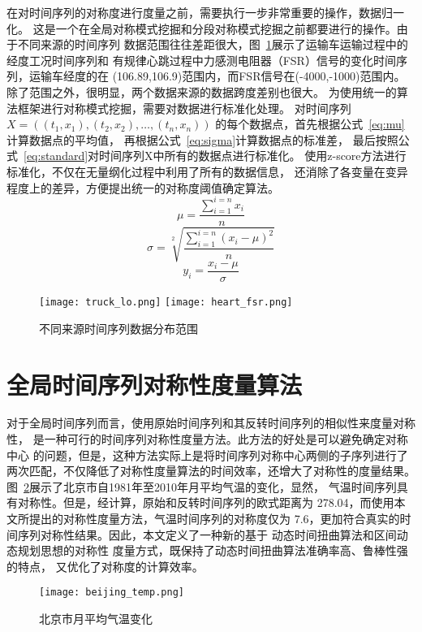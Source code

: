 在对时间序列的对称度进行度量之前，需要执行一步非常重要的操作，数据归一化。
这是一个在全局对称模式挖掘和分段对称模式挖掘之前都要进行的操作。由于不同来源的时间序列
数据范围往往差距很大，图~\ref{fig:data_range}展示了运输车运输过程中的经度工况时间序列和
有规律心跳过程中力感测电阻器（FSR）信号的变化时间序列，运输车经度的在
(106.89,106.9)范围内，而FSR信号在(-4000,-1000)范围内。
除了范围之外，很明显，两个数据来源的数据跨度差别也很大。
为使用统一的算法框架进行对称模式挖掘，需要对数据进行标准化处理。
对时间序列$X=\left(\left(t_{1}, x_{1}\right),\left(t_{2}, x_{2}\right), \ldots,\left(t_{n}, x_{n}\right)\right)$
的每个数据点，首先根据公式~\ref{eq:mu}计算数据点的平均值，
再根据公式~\ref{eq:sigma}计算数据点的标准差，
最后按照公式~\ref{eq:standard}对时间序列X中所有的数据点进行标准化。
使用z-score方法进行标准化，不仅在无量纲化过程中利用了所有的数据信息，
还消除了各变量在变异程度上的差异，方便提出统一的对称度阈值确定算法。
\begin{equation}
  \mu=\frac{\sum_{i=1}^{i=n} x_{i}}{n}
  \label{eq:mu}
\end{equation}
\begin{equation}
  \sigma=\sqrt[2]{\frac{\sum_{i=1}^{i=n}\left(x_{i}-\mu\right)^{2}}{n}}
  \label{eq:sigma}
\end{equation}
\begin{equation}
  y_{i}=\frac{x_{i}-\mu}{\sigma}
  \label{eq:standard}
\end{equation}
\begin{figure}
  \centering
  {\texttt{[image: truck\_lo.png]}}
  {\texttt{[image: heart\_fsr.png]}}
  \caption{不同来源时间序列数据分布范围}
  \label{fig:data_range}
\end{figure}

\section{全局时间序列对称性度量算法}

对于全局时间序列而言，使用原始时间序列和其反转时间序列的相似性来度量对称性，
是一种可行的时间序列对称性度量方法。此方法的好处是可以避免确定对称中心
的问题，但是，这种方法实际上是将时间序列对称中心两侧的子序列进行了
两次匹配，不仅降低了对称性度量算法的时间效率，还增大了对称性的度量结果。
图~\ref{fig:beijing_temp}展示了北京市自1981年至2010年月平均气温的变化，显然，
气温时间序列具有对称性。但是，经计算，原始和反转时间序列的欧式距离为
278.04，而使用本文所提出的对称性度量方法，气温时间序列的对称度仅为
7.6，更加符合真实的时间序列对称性结果。因此，本文定义了一种新的基于
动态时间扭曲算法和区间动态规划思想的对称性
度量方式，既保持了动态时间扭曲算法准确率高、鲁棒性强的特点，
又优化了对称度的计算效率。
\begin{figure}
  \centering
  \texttt{[image: beijing\_temp.png]}
  \caption{北京市月平均气温变化}
  \label{fig:beijing_temp}
\end{figure}

